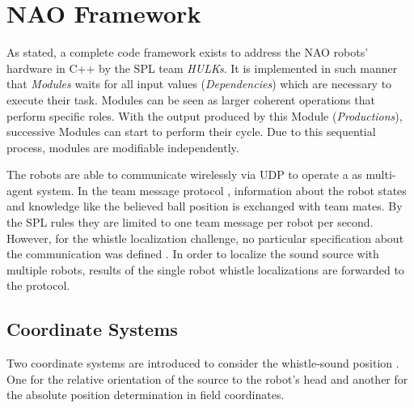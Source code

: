 \section{NAO Framework}
\label{sec:03_naoFramework}

As stated, a complete code framework exists to address the NAO robots' hardware
in C++ by the \ac{SPL} team \textit{HULKs}. 
It is implemented in such manner that \textit{Modules}   waits for all input
values (\textit{Dependencies}) which are necessary to execute their task.
Modules can be seen as larger coherent operations that perform specific roles.
With the output produced by this Module  (\textit{Productions}), successive
Modules can start to perform their cycle.
Due to this sequential process, modules  are modifiable independently. 

The robots are able to communicate wirelessly via \ac{UDP} to operate a as
multi-agent system.
In the team message protocol , information about the robot states and
knowledge like the believed ball position is exchanged with team mates.
By the \ac{SPL} rules \cite{rules} they are limited to one team message per
robot per second.
However, for the whistle localization challenge, no particular specification
about the communication was defined \cite{technical_challenge}.
In order to localize the sound source with multiple robots, results of the
single robot whistle localizations are forwarded to the protocol.

\subsection{Coordinate Systems}
\label{subsec:03_coordinates}

Two coordinate systems are introduced to consider the whistle-sound position .
One for the relative orientation of the source to the robot's head and another
for the absolute position determination in field coordinates.

